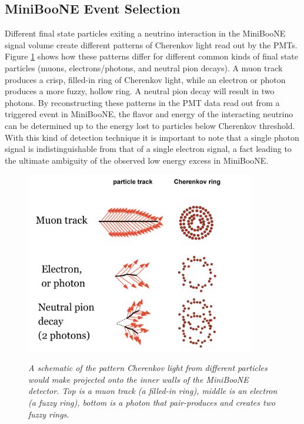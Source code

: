 \subsection{MiniBooNE Event Selection}

Different final state particles exiting a neutrino interaction in the MiniBooNE signal volume create different patterns of Cherenkov light read out by the PMTs. Figure \ref{georgia_cherenkov_cartoon_fig} \cite{GeorgiaThesis} shows how these patterns differ for different common kinds of final state particles (muons, electrons/photons, and neutral pion decays). A muon track produces a crisp, filled-in ring of Cherenkov light, while an electron or photon produces a more fuzzy, hollow ring. A neutral pion decay will result in two photons. By reconstructing these patterns in the PMT data read out from a triggered event in MiniBooNE, the flavor and energy of the interacting neutrino can be determined up to the energy lost to particles below Cherenkov threshold. With this kind of detection technique it is important to note that a single photon signal is indistinguishable from that of a single electron signal, a fact leading to the ultimate ambiguity of the observed low energy excess in MiniBooNE.\\

\begin{figure}[ht!]
\centering
	\includegraphics[width=0.9\textwidth]{Figures/georgia_cherenkov_cartoon.png} \\
\caption{\textit{A schematic of the pattern Cherenkov light from different particles would make projected onto the inner walls of the MiniBooNE detector. Top is a muon track (a filled-in ring), middle is an electron (a fuzzy ring), bottom is a photon that pair-produces and creates two fuzzy rings.}}\label{georgia_cherenkov_cartoon_fig}
\end{figure}

